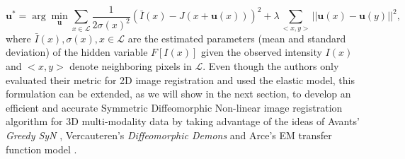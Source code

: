 \begin{equation}\label{eq:elastic}
    \mathbf{u}^{*} = \arg \min_{\mathbf{u}} \sum_{x \in \mathcal{L}} \frac{1}{2 \sigma(x)^{2}} ( \bar{I}(x) - J(x + \mathbf{u}(x)))^{2} + \lambda \sum_{<x, y>} ||\mathbf{u}(x) - \mathbf{u}(y)||^{2},
\end{equation}
where $\bar{I}(x), \sigma(x), x\in \mathcal{L}$ are the estimated parameters (mean and standard deviation) of the hidden variable $F[I(x)]$ given the
observed intensity $I(x)$ and $<x, y>$ denote neighboring pixels in $\mathcal{L}$. Even though the authors only evaluated their metric for 2D image registration and used
the elastic model, this formulation can be extended, as we will show in the next section, to develop an efficient and accurate Symmetric Diffeomorphic Non-linear image
registration algorithm for 3D multi-modality data by taking advantage of the ideas of Avants' \textit{Greedy SyN} \cite{Avants2008},
Vercauteren's \textit{Diffeomorphic Demons} \cite{Vercauteren2009}and Arce's EM transfer function model \cite{Arce-santana2014}.\\
